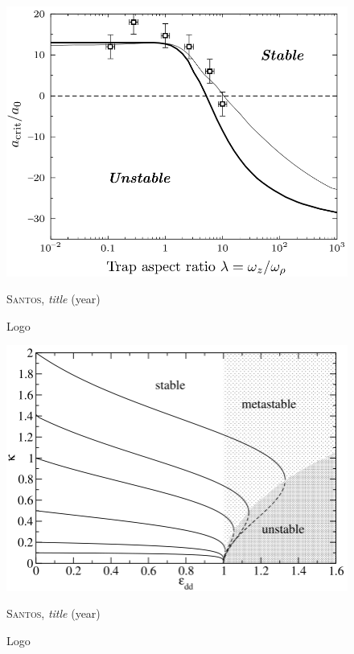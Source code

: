 \begin{figure}[H]
    \centering
    \includegraphics[width=1.0\textwidth]{IMAGE/acrit.png}\\
    \caption{Logo}
    \textsc{Santos}, \emph{title} (year)
    \label{fig:acrit}
\end{figure}

\begin{figure}[H]
    \centering
    \includegraphics[width=1.0\textwidth]{IMAGE/stability.png}\\
    \caption{Logo}
    \textsc{Santos}, \emph{title} (year)
    \label{fig:stability}
\end{figure}

